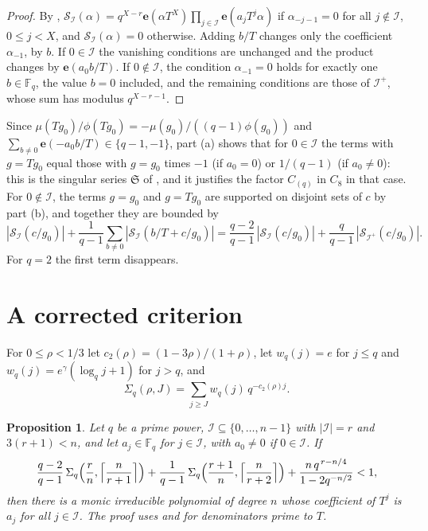 \documentclass[11pt,a4paper]{amsart}
\newtheorem{proposition}[theorem]{Proposition}
\theoremstyle{remark}
\newcommand{\F}{\mathbb{F}}
\newcommand{\cS}{\mathcal{S}}
\numberwithin{equation}{section}
\begin{document}
\begin{proof}
By \cite[(8)]{Ha}, $\cS_{\mathcal I}(\alpha)=q^{X-r}\mathbf e(\alpha T^X)\prod_{j\in\mathcal I}\mathbf e(a_jT^j\alpha)$
if $\alpha_{-j-1}=0$ for all $j\notin\mathcal I$, $0\le j<X$, and $\cS_{\mathcal I}(\alpha)=0$ otherwise. Adding
$b/T$ changes only the coefficient $\alpha_{-1}$, by $b$. If $0\in\mathcal I$ the vanishing conditions are unchanged
and the product changes by $\mathbf e(a_0b/T)$. If $0\notin\mathcal I$, the condition $\alpha_{-1}=0$ holds for
exactly one $b\in\F_q$, the value $b=0$ included, and the remaining conditions are those of $\mathcal I^+$, whose sum
has modulus $q^{X-r-1}$.
\end{proof}

Since $\mu(Tg_0)/\phi(Tg_0)=-\mu(g_0)/((q-1)\phi(g_0))$ and $\sum_{b\ne0}\mathbf e(-a_0b/T)\in\{q-1,-1\}$, part (a)
shows that for $0\in\mathcal I$ the terms with $g=Tg_0$ equal those with $g=g_0$ times $-1$ (if $a_0=0$) or
$1/(q-1)$ (if $a_0\ne0$): this is the singular series $\mathfrak S$ of \cite[(2)]{Ha}, and it justifies the factor
$C_{(q)}$ in $C_8$ in that case. For $0\notin\mathcal I$, the terms $g=g_0$ and $g=Tg_0$ are supported on
disjoint sets of $c$ by part (b), and together they are bounded by
\[
|\cS_{\mathcal I}(c/g_0)|+\frac1{q-1}\sum_{b\ne0}|\cS_{\mathcal I}(b/T+c/g_0)|
=\frac{q-2}{q-1}\,|\cS_{\mathcal I}(c/g_0)|+\frac q{q-1}\,|\cS_{\mathcal I^+}(c/g_0)| .
\]
For $q=2$ the first term disappears.

\section{A corrected criterion}\label{sec:criterion}
For $0\le\rho<1/3$ let $c_2(\rho)=(1-3\rho)/(1+\rho)$, let $w_q(j)=e$ for $j\le q$ and
$w_q(j)=e^\gamma(\log_qj+1)$ for $j>q$, and
\[
\Sigma_q(\rho,J)=\sum_{j\ge J}w_q(j)\,q^{-c_2(\rho)j}.
\]

\begin{proposition}\label{prop:restored}
Let $q$ be a prime power, $\mathcal I\subseteq\{0,\dots,n-1\}$ with $|\mathcal I|=r$ and $3(r+1)<n$, and let
$a_j\in\F_q$ for $j\in\mathcal I$, with $a_0\ne0$ if $0\in\mathcal I$. If
\begin{equation}\label{eq:crit}
\frac{q-2}{q-1}\,\Sigma_q\Bigl(\frac rn,\Bigl\lceil\frac n{r+1}\Bigr\rceil\Bigr)
+\frac1{q-1}\,\Sigma_q\Bigl(\frac{r+1}n,\Bigl\lceil\frac n{r+2}\Bigr\rceil\Bigr)
+\frac{n\,q^{\,r-n/4}}{1-2q^{-n/2}}<1,
\end{equation}
then there is a monic irreducible polynomial of degree $n$ whose coefficient of $T^j$ is $a_j$ for all
$j\in\mathcal I$. The proof uses \cite[Lemmas~2.1--2.4, 2.8]{Ha} and \cite[Lemma~2.7]{Ha} for denominators prime
to $T$.
\end{proposition}
\end{document}
